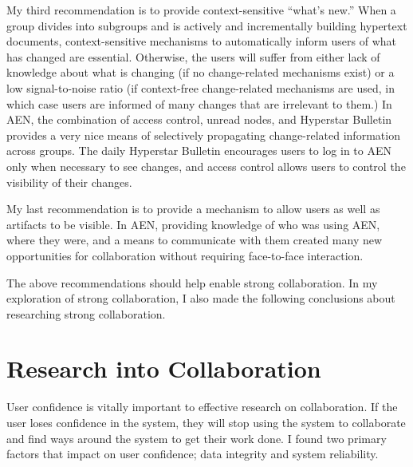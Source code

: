 My third recommendation is to provide context-sensitive ``what's new.''
When a group divides into subgroups and is actively and incrementally
building hypertext documents, context-sensitive mechanisms to automatically
inform users of what has changed are essential. Otherwise, the users will
suffer from either lack of knowledge about what is changing (if no
change-related mechanisms exist) or a low signal-to-noise ratio (if
context-free change-related mechanisms are used, in which case users are
informed of many changes that are irrelevant to them.)  In AEN, the
combination of access control, unread nodes, and Hyperstar Bulletin
provides a very nice means of selectively propagating change-related
information across groups.  The daily Hyperstar Bulletin encourages users
to log in to AEN only when necessary to see changes, and access control
allows users to control the visibility of their changes.

My last recommendation is to provide a mechanism to allow users as well as
artifacts to be visible.  In AEN, providing knowledge of who was using AEN,
where they were, and a means to communicate with them created many new
opportunities for collaboration without requiring face-to-face interaction.
  
The above recommendations should help enable strong collaboration.  In my
exploration of strong collaboration, I also made the following conclusions
about researching strong collaboration.

\section{Research into Collaboration}
\label{sec:con-research}

User confidence is vitally important to effective research on
collaboration.  If the user loses confidence in the system, they will stop
using the system to collaborate and find ways around the system to get
their work done.  I found two primary factors that impact on user
confidence; data integrity and system reliability.

